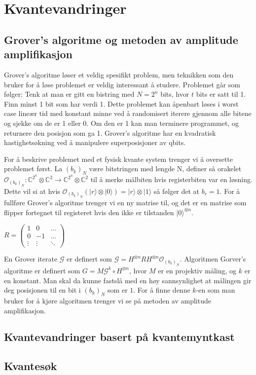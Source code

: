 \section{Kvantevandringer}

\subsection{Grover's algoritme og metoden av amplitude amplifikasjon}

    Grover's algoritme løser et veldig spesifikt problem, men teknikken som den bruker for å løse problemet er veldig interessant å studere. Problemet går som følger: Tenk at man er gitt en bistring med $N=2^n$ bits, hvor $t$ bits er satt til 1. Finn minst 1 bit som har verdi 1. Dette problemet kan åpenbart løses i worst case lineær tid med konstant minne ved å randomisert iterere gjennom alle bitene og sjekke om de er 1 eller 0. Om den er 1 kan man terminere programmet, og returnere den posisjon som ga 1. Grover's algoritme har en kvadratisk hastighetsøkning ved å manipulere superposisjoner av qbits.

    For å beskrive problemet med et fysisk kvante system trenger vi å oversette problemet først. La $(b_k)_N$ være bitstringen med lengde N, definer så orakelet $\mathcal{O}_{(b_k)_N}:\mathbb{C}^{2^n} \otimes \mathbb{C}^2 \rightarrow \mathbb{C}^{2^n} \otimes \mathbb{C}^2$ til å merke målbiten hvis registerbiten var en løsning. Dette vil si at hvis $\mathcal{O}_{(b_k)_N}(|r\rangle\otimes |0\rangle) = |r\rangle\otimes |1\rangle$ så følger det at $b_r = 1$. For å fullføre Grover's algoritme trenger vi en ny matrise til, og det er en matrise som flipper fortegnet til registeret hvis den ikke er tilstanden $|0\rangle^{\otimes n}$.
    \begin{center}
        \begin{math}
            R = \begin{pmatrix}
                1 & 0 & ... \\
                0 & -1 & ... \\
                \vdots & \vdots & \ddots
            \end{pmatrix}
        \end{math}
    \end{center}

    En Grover iterate $\mathcal{G}$ er definert som $\mathcal{G}=H^{\otimes n}RH^{\otimes n}\mathcal{O}_{(b_k)_N}$. Algoritmen Gorver's algoritme er definert som $G = M\mathcal{G}^k\circ H^{\otimes n}$, hvor $M$ er en projektiv måling, og $k$ er en konstant. Man skal da kunne fastslå med en høy sannsynlighet at målingen gir deg posisjonen til en bit i $(b_k)_N$ som er $1$. For å finne denne $k$-en som man bruker for å kjøre algoritmen trenger vi se på metoden av amplitude amplifikasjon.

    \lipsum[7]
        
\subsection{Kvantevandringer basert på kvantemyntkast}

\lipsum[8]

\lipsum[9]

\lipsum[10]

\subsection{Kvantesøk}

\lipsum[11]